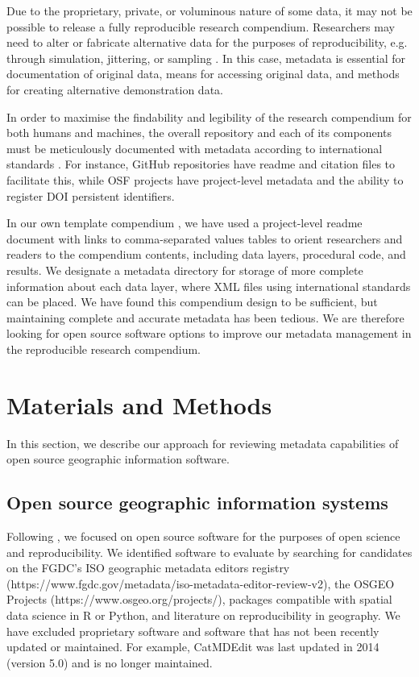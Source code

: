 \documentclass{isprs} %
\begin{document}
Due to the proprietary, private, or voluminous nature of some data, it may not be possible to release a fully reproducible research compendium.
Researchers may need to alter or fabricate alternative data for the purposes of reproducibility, e.g. through simulation, jittering, or sampling \citep{Tullis2021,Singleton2016}. 
In this case, metadata is essential for documentation of original data, means for accessing original data, and methods for creating alternative demonstration data.

In order to maximise the findability and legibility of the research compendium for both humans and machines, the overall repository and each of its components must be meticulously documented with metadata according to international standards \citep{Wilkinson2016,Wilson2021}.
For instance, GitHub repositories have readme and citation files to facilitate this, while OSF projects have project-level metadata and the ability to register DOI persistent identifiers.

In our own template compendium \citep{Kedron_Holler_2022}, we have used a project-level readme document with links to comma-separated values tables to orient researchers and readers to the compendium contents, including data layers, procedural code, and results.
We designate a metadata directory for storage of more complete information about each data layer, where XML files using international standards can be placed.
We have found this compendium design to be sufficient, but maintaining complete and accurate metadata has been tedious.
We are therefore looking for open source software options to improve our metadata management in the reproducible research compendium.

\section{Materials and Methods}\label{methods}

In this section, we describe our approach for reviewing metadata capabilities of open source geographic information software.

\subsection{Open source geographic information systems}\label{software}

Following \citet{Singleton2016}, we focused on open source software for the purposes of open science and reproducibility.
We identified software to evaluate by searching for candidates on the FGDC's ISO geographic metadata editors registry (https://www.fgdc.gov/metadata/iso-metadata-editor-review-v2), the OSGEO Projects (https://www.osgeo.org/projects/), packages compatible with spatial data science in R or Python, and literature on reproducibility in geography.
We have excluded proprietary software and software that has not been recently updated or maintained. 
For example, CatMDEdit was last updated in 2014 (version 5.0) and is no longer maintained. 
\end{document}
